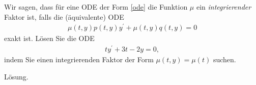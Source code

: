 \begin{exercise}
Wir sagen, dass für eine ODE der Form \eqref{ode} die Funktion $\mu$ ein
\textit{integrierender} Faktor ist, falls die (äquivalente) ODE
\begin{align*}
  \mu(t,y)p(t,y)y^{\prime} + \mu(t,y)q(t,y) = 0
\end{align*}
exakt ist. Lösen Sie die ODE
\begin{align*}
  ty^{\prime} + 3t - 2y = 0,
\end{align*}
indem Sie einen integrierenden Faktor der Form $\mu(t,y) = \mu(t)$ suchen. \\
\end{exercise}
\begin{solution}
Lösung.
\end{solution}
